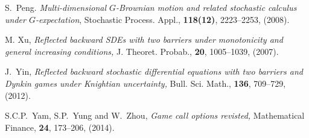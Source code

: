 \documentclass{amsart}
\numberwithin{equation}{section}
\begin{document}
\begin{thebibliography}{99}
S.~Peng.
{\em Multi-dimensional {$G$}-{B}rownian motion and related stochastic
  calculus under {$G$}-expectation},
Stochastic Process. Appl., {\bf 118(12)}, 2223--2253, (2008).

M. Xu,
{\em Reflected backward SDEs with two barriers under monotonicity and general increasing conditions,}
 J. Theoret.
Probab., {\bf 20}, 1005--1039, (2007).


J.~Yin,
{\em Reflected backward stochastic differential equations with two barriers and Dynkin games under Knightian uncertainty,}
Bull. Sci. Math., {\bf 136}, 709--729, (2012).

 S.C.P.~Yam, S.P.~Yung and W.~Zhou,
{\em Game call options revisted,}
Mathematical Finance, {\bf 24}, 173--206, (2014).
\end{thebibliography}
\end{document}
